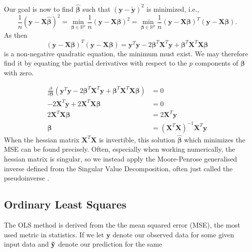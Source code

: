\documentclass{article}
\begin{document}
Our goal is now to find $\boldsymbol{\hat{\beta}}$ such that $\left( \boldsymbol{y} - \boldsymbol{\tilde{y}} \right)^2$ is minimized, i.e.,
\begin{equation*}
    \frac{1}{n} \left( \boldsymbol{y} - \boldsymbol{X} \boldsymbol{\hat{\beta}}\right)^2  = \min_{\boldsymbol{\beta} \in \mathbb{R}^p} \frac{1}{n} \left( \boldsymbol{y} - \boldsymbol{X\beta} \right)^2 = \min_{\boldsymbol{\beta} \in \mathbb{R}^p} \frac{1}{n} \left( \boldsymbol{y} - \boldsymbol{X\beta} \right)^T \left( \boldsymbol{y} - \boldsymbol{X\beta} \right).
\end{equation*}
As then
\begin{equation*}
    \left( \boldsymbol{y} - \boldsymbol{X\beta} \right)^T \left( \boldsymbol{y} - \boldsymbol{X\beta} \right) = \boldsymbol{y}^T \boldsymbol{y} - 2 \boldsymbol{\beta}^T \boldsymbol{X}^T \boldsymbol{y} + \boldsymbol{\beta}^T \boldsymbol{X}^T \boldsymbol{X} \boldsymbol{\beta} 
\end{equation*}
is a non-negative quadratic equation, the minimum must exist. We may therefore find it by equating the partial derivatives with respect to the $p$ components of $\boldsymbol{\beta}$ with zero.

\begin{align*}
    \frac{\partial}{\partial \boldsymbol{\beta}} \left( \boldsymbol{y}^T \boldsymbol{y} - 2 \boldsymbol{\beta}^T \boldsymbol{X}^T \boldsymbol{y} + \boldsymbol{\beta}^T \boldsymbol{X}^T \boldsymbol{X} \boldsymbol{\beta} \right) &= 0 \\
    -2 \boldsymbol{X}^T \boldsymbol{y} + 2 \boldsymbol{X}^T \boldsymbol{X \beta} &= 0 \\
    2 \boldsymbol{X}^T \boldsymbol{X \beta} &= 2 \boldsymbol{X}^T \boldsymbol{y} \\
    \boldsymbol{\beta} &= \left( \boldsymbol{X}^T \boldsymbol{X} \right)^{-1} \boldsymbol{X}^T \boldsymbol{y}
\end{align*}
When the hessian matrix $\boldsymbol{X}^T \boldsymbol{X}$ is invertible, this solution $\boldsymbol{\hat{\beta}}$ which minimizes the MSE can be found precisely. Often, especially when working numerically, the hessian matrix is singular, so we instead apply the Moore-Penrose generalised inverse defined from the Singular Value Decomposition, often just called the pseudoinverse \cite{introNumeric}.

\subsection{Ordinary Least Squares}
The OLS method is derived from the the mean squared error (MSE), the most used metric in statistics. If we let $\mathbf{y}$ denote our observed data for some given input data and $\mathbf{\Tilde{y}}$ denote our prediction for the same 
\end{document}
